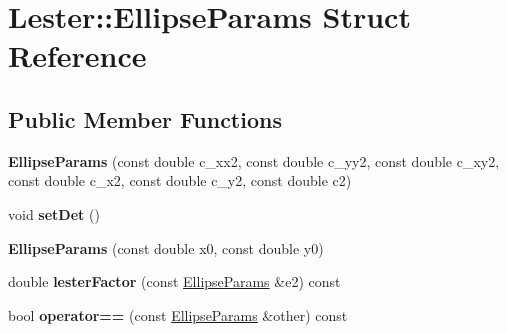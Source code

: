 \hypertarget{structLester_1_1EllipseParams}{\section{Lester\-:\-:Ellipse\-Params Struct Reference}
\label{structLester_1_1EllipseParams}
}
\subsection*{Public Member Functions}
\begin{DoxyCompactItemize}
\item 
\hypertarget{structLester_1_1EllipseParams_a38ae9677eb46aee9fcd5aa51c86ae9a8}{{\bfseries Ellipse\-Params} (const double c\-\_\-xx2, const double c\-\_\-yy2, const double c\-\_\-xy2, const double c\-\_\-x2, const double c\-\_\-y2, const double c2)}\label{structLester_1_1EllipseParams_a38ae9677eb46aee9fcd5aa51c86ae9a8}

\item 
\hypertarget{structLester_1_1EllipseParams_ad4cc8073619a8224ece6e6bed8d3ccd2}{void {\bfseries set\-Det} ()}\label{structLester_1_1EllipseParams_ad4cc8073619a8224ece6e6bed8d3ccd2}

\item 
\hypertarget{structLester_1_1EllipseParams_a74def2b1875f0381b692341826503035}{{\bfseries Ellipse\-Params} (const double x0, const double y0)}\label{structLester_1_1EllipseParams_a74def2b1875f0381b692341826503035}

\item 
\hypertarget{structLester_1_1EllipseParams_a9b99b405ad6f4635e9d726ad4b70fb1d}{double {\bfseries lester\-Factor} (const \hyperlink{structLester_1_1EllipseParams}{Ellipse\-Params} \&e2) const }\label{structLester_1_1EllipseParams_a9b99b405ad6f4635e9d726ad4b70fb1d}

\item 
\hypertarget{structLester_1_1EllipseParams_af0428a20e24e380a4abebc7b201afcc0}{bool {\bfseries operator==} (const \hyperlink{structLester_1_1EllipseParams}{Ellipse\-Params} \&other) const }\label{structLester_1_1EllipseParams_af0428a20e24e380a4abebc7b201afcc0}

\end{DoxyCompactItemize}

